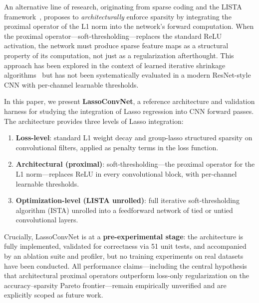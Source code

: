 \documentclass{article}
\begin{document}
An alternative line of research, originating from sparse coding and the LISTA
framework~\cite{gregor2010learning}, proposes to \emph{architecturally} enforce
sparsity by integrating the proximal operator of the L1 norm into the network's
forward computation. When the proximal operator---soft-thresholding---replaces
the standard ReLU activation, the network must produce sparse feature maps as a
structural property of its computation, not just as a regularization afterthought.
This approach has been explored in the context of learned iterative shrinkage
algorithms~\cite{zhang2018ista, xin2016max} but has not been systematically
evaluated in a modern ResNet-style CNN with per-channel learnable thresholds.

In this paper, we present \textbf{LassoConvNet}, a reference architecture and
validation harness for studying the integration of Lasso regression into CNN
forward passes. The architecture provides three levels of Lasso integration:

\begin{enumerate}
    \item \textbf{Loss-level}: standard L1 weight decay and group-lasso structured
          sparsity on convolutional filters, applied as penalty terms in the loss
          function.
    \item \textbf{Architectural (proximal)}: soft-thresholding---the proximal
          operator for the L1 norm---replaces ReLU in every convolutional block,
          with per-channel learnable thresholds.
    \item \textbf{Optimization-level (LISTA unrolled)}: full iterative
          soft-thresholding algorithm (ISTA) unrolled into a feedforward network
          of tied or untied convolutional layers.
\end{enumerate}

Crucially, LassoConvNet is at a \textbf{pre-experimental stage}: the architecture
is fully implemented, validated for correctness via 51 unit tests, and accompanied
by an ablation suite and profiler, but no training experiments on real datasets
have been conducted. All performance claims---including the central hypothesis that
architectural proximal operators outperform loss-only regularization on the
accuracy--sparsity Pareto frontier---remain empirically unverified and are
explicitly scoped as future work.
\end{document}
